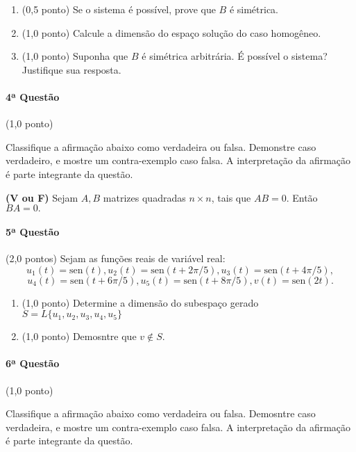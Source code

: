\documentclass[12pt,a4paper]{article}
\newcommand{\sen}{\mathrm{sen}}
\begin{document}
\begin{enumerate}[label=\alph*)]
    
    \item (0,5 ponto) Se o sistema é possível, prove que $B$ é simétrica.
    \item (1,0 ponto) Calcule a dimensão do espaço solução do caso homogêneo.
    \item (1,0 ponto) Suponha que $B$ é simétrica arbitrária. É possível o sistema? Justifique sua resposta.

\end{enumerate}

\paragraph{4ª Questão} (1,0 ponto)

Classifique a afirmação abaixo como verdadeira ou falsa. Demonstre caso verdadeiro, e mostre um contra-exemplo caso falsa. A interpretação da afirmação é parte integrante da questão.
\begin{center}
    \textbf{(V ou F)} Sejam $A, B$ matrizes quadradas $n \times n$, tais que $AB = 0$. Então $BA = 0.$  
\end{center}


\paragraph{5ª Questão} (2,0 pontos)
Sejam as funções reais de variável real:
$$ u_1(t)=\sen{(t)}, u_2(t)=\sen{(t + 2\pi/5)}, u_3(t)=\sen{(t + 4\pi/5)},$$
$$u_4(t)=\sen{(t + 6\pi/5)}, u_5(t)=\sen{(t + 8\pi/5)}, v(t)=\sen{(2t)}.$$

\begin{enumerate}[label=\alph*)]
    
    \item (1,0 ponto) Determine a dimensão do subespaço gerado $S = L\{u_1, u_2, u_3, u_4, u_5 \}$
    \item (1,0 ponto) Demosntre que $v \notin S$.

\end{enumerate}

\paragraph{6ª Questão} (1,0 ponto)

Classifique a afirmação abaixo como verdadeira ou falsa. Demosntre caso verdadeira, e mostre um contra-exemplo caso falsa. A interpretação da afirmação é parte integrante da questão.
\end{document}
